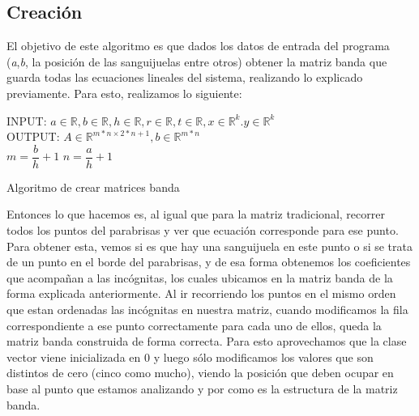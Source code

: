 \documentclass[10pt, a4paper]{article}
\begin{document}
\subsection{Creaci\'on}

El objetivo de este algoritmo es que dados los datos de entrada del programa (\textit{a},\textit{b}, la posici\'on de las sanguijuelas entre otros) obtener la matriz banda que guarda todas las ecuaciones lineales del sistema, realizando lo explicado previamente. Para esto, realizamos lo siguiente:

\begin{algorithm}[H]
INPUT: $a \in \mathbb{R}, b \in \mathbb{R}, h \in \mathbb{R}, r \in \mathbb{R}, t \in \mathbb{R}, x \in \mathbb{R}^{k}. y \in \mathbb{R}^{k}$ \\
OUTPUT: $A \in \mathbb{R}^{m*n \times 2*n+1}, b \in \mathbb{R}^{m*n}$ \\
$m=\dfrac{b}{h}+1$\;
$n=\dfrac{a}{h}+1$\;
\caption{Algoritmo de crear matrices banda}
\end{algorithm} 

Entonces lo que hacemos es, al igual que para la matriz tradicional, recorrer todos los puntos del parabrisas y ver que ecuaci\'on corresponde para ese punto. Para obtener esta, vemos si es que hay una sanguijuela en este punto o si se trata de un punto en el borde del parabrisas, y de esa forma obtenemos los coeficientes que acompañan a las inc\'ognitas, los cuales ubicamos en la matriz banda de la forma explicada anteriormente. Al ir recorriendo los puntos en el mismo orden que estan ordenadas las inc\'ognitas en nuestra matriz, cuando modificamos la fila correspondiente a ese punto correctamente para cada uno de ellos, queda la matriz banda construida de forma correcta. Para esto aprovechamos que la clase vector viene inicializada en 0 y luego s\'olo modificamos los valores que son distintos de cero (cinco como mucho), viendo la posici\'on que deben ocupar en base al punto que estamos analizando y por como es la estructura de la matriz banda.
\end{document}
